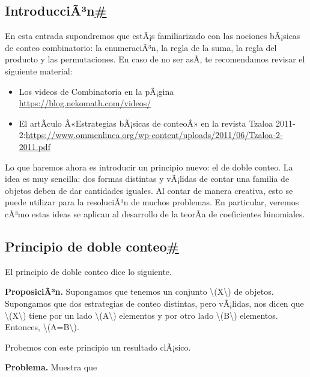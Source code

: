 \documentclass[
]{article}
\begin{document}
\label{introduccion}
\subsection{\texorpdfstring{IntroducciÃ³n\hyperref[introduccion]{\#}}{IntroducciÃ³n\#}}\label{introducciuxe3uxb3n}

En esta entrada supondremos que estÃ¡s familiarizado con las nociones
bÃ¡sicas de conteo combinatorio: la enumeraciÃ³n, la regla de la suma,
la regla del producto y las permutaciones. En caso de no ser asÃ­, te
recomendamos revisar el siguiente material:

\begin{itemize}
\item
  Los videos de Combinatoria en la pÃ¡gina
  \url{https://blog.nekomath.com/videos/}
\item
  El artÃ­culo Â«Estrategias bÃ¡sicas de conteoÂ» en la revista Tzaloa
  2011-2:\url{https://www.ommenlinea.org/wp-content/uploads/2011/06/Tzaloa-2-2011.pdf}
\end{itemize}

Lo que haremos ahora es introducir un principio nuevo: el de doble
conteo. La idea es muy sencilla: dos formas distintas y vÃ¡lidas de
contar una familia de objetos deben de dar cantidades iguales. Al contar
de manera creativa, esto se puede utilizar para la resoluciÃ³n de muchos
problemas. En particular, veremos cÃ³mo estas ideas se aplican al
desarrollo de la teorÃ­a de coeficientes binomiales.

\subsection{\texorpdfstring{Principio de doble
conteo\hyperref[principio-de-doble-conteo]{\#}}{Principio de doble conteo\#}}\label{principio-de-doble-conteo}

El principio de doble conteo dice lo siguiente.

\textbf{ProposiciÃ³n.} Supongamos que tenemos un conjunto
{\textbackslash(X\textbackslash)} de objetos. Supongamos que dos
estrategias de conteo distintas, pero vÃ¡lidas, nos dicen que
{\textbackslash(X\textbackslash)} tiene por un lado
{\textbackslash(A\textbackslash)} elementos y por otro lado
{\textbackslash(B\textbackslash)} elementos. Entonces,
{\textbackslash(A=B\textbackslash)}.

Probemos con este principio un resultado clÃ¡sico.

\textbf{Problema.} Muestra que
\end{document}
